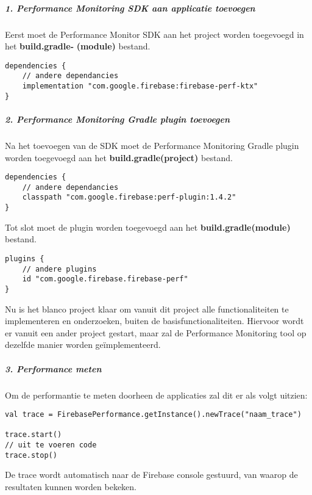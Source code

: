 \subparagraph{1. Performance Monitoring SDK aan applicatie toevoegen}
Eerst moet de Performance Monitor SDK aan het project worden toegevoegd in het \textbf{build.gradle-} \textbf{(module)} bestand.
\begin{verbatim}
dependencies {
    // andere dependancies
    implementation "com.google.firebase:firebase-perf-ktx"
}
\end{verbatim}

\subparagraph{2. Performance Monitoring Gradle plugin toevoegen}
Na het toevoegen van de SDK moet de Performance Monitoring Gradle plugin worden toegevoegd 
aan het \textbf{build.gradle(project)} bestand.
\begin{verbatim}
dependencies {
    // andere dependancies
    classpath "com.google.firebase:perf-plugin:1.4.2"
}
\end{verbatim}
Tot slot moet de plugin worden toegevoegd aan het \textbf{build.gradle(module)} bestand.
\begin{verbatim}
plugins {
    // andere plugins
    id "com.google.firebase.firebase-perf"
}
\end{verbatim}
Nu is het blanco project klaar om vanuit dit project alle functionaliteiten te 
implementeren en onderzoeken, buiten de basisfunctionaliteiten. Hiervoor wordt er vanuit een ander project gestart, 
maar zal de Performance Monitoring tool op dezelfde manier worden geïmplementeerd.

\subparagraph{3. Performance meten}
Om de performantie te meten doorheen de applicaties zal dit er als 
volgt uitzien:
\begin{verbatim}
val trace = FirebasePerformance.getInstance().newTrace("naam_trace")

trace.start()
// uit te voeren code
trace.stop()
\end{verbatim}
De trace wordt automatisch naar de Firebase console gestuurd, van waarop de 
resultaten kunnen worden bekeken.